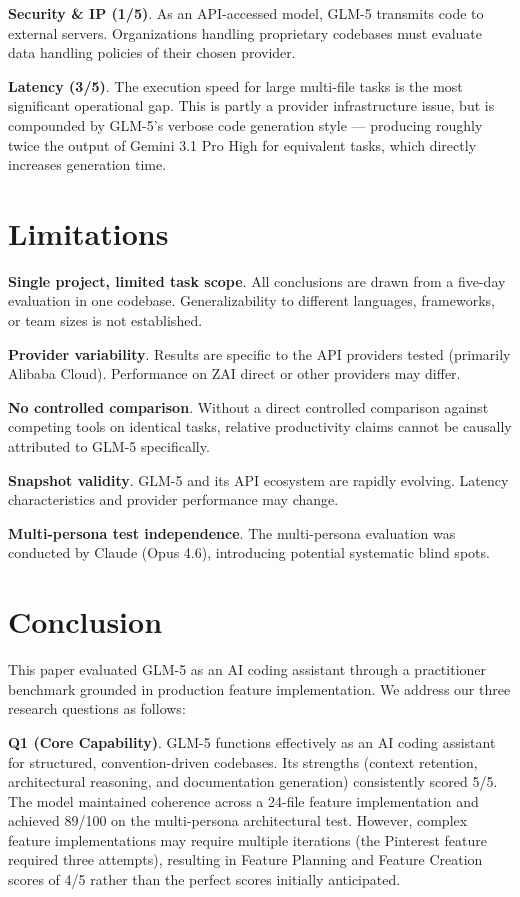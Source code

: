 \documentclass[conference]{IEEEtran}
\begin{document}
\textbf{Security \& IP (1/5)}. As an API-accessed model, GLM-5 transmits code to external servers. Organizations handling proprietary codebases must evaluate data handling policies of their chosen provider.

\textbf{Latency (3/5)}. The execution speed for large multi-file tasks is the most significant operational gap. This is partly a provider infrastructure issue, but is compounded by GLM-5's verbose code generation style --- producing roughly twice the output of Gemini 3.1 Pro High for equivalent tasks, which directly increases generation time.

\section{Limitations}

\textbf{Single project, limited task scope}. All conclusions are drawn from a five-day evaluation in one codebase. Generalizability to different languages, frameworks, or team sizes is not established.

\textbf{Provider variability}. Results are specific to the API providers tested (primarily Alibaba Cloud). Performance on ZAI direct or other providers may differ.

\textbf{No controlled comparison}. Without a direct controlled comparison against competing tools on identical tasks, relative productivity claims cannot be causally attributed to GLM-5 specifically.

\textbf{Snapshot validity}. GLM-5 and its API ecosystem are rapidly evolving. Latency characteristics and provider performance may change.

\textbf{Multi-persona test independence}. The multi-persona evaluation was conducted by Claude (Opus 4.6), introducing potential systematic blind spots.

\section{Conclusion}
This paper evaluated GLM-5 as an AI coding assistant through a practitioner benchmark grounded in production feature implementation. We address our three research questions as follows:

\textbf{Q1 (Core Capability)}. GLM-5 functions effectively as an AI coding assistant for structured, convention-driven codebases. Its strengths (context retention, architectural reasoning, and documentation generation) consistently scored 5/5. The model maintained coherence across a 24-file feature implementation and achieved 89/100 on the multi-persona architectural test. However, complex feature implementations may require multiple iterations (the Pinterest feature required three attempts), resulting in Feature Planning and Feature Creation scores of 4/5 rather than the perfect scores initially anticipated.
\end{document}
